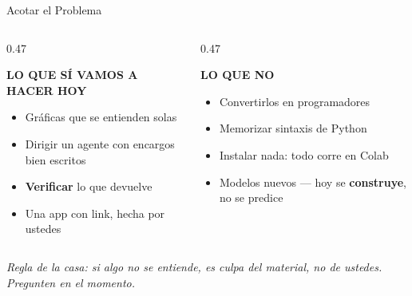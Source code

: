\documentclass[aspectratio=169, 11pt]{beamer}
\begin{document}
\begin{frame}[shrink=5]{Acotar el Problema}
  \vspace{2pt}
  \begin{columns}[T]
    \begin{column}{0.47\textwidth}
      \begin{tcolorbox}[colback=arcaGray, colframe=codeGreen, boxrule=0pt,
        leftrule=3pt, arc=3pt, left=8pt, right=8pt, top=5pt, bottom=5pt]
        {\scriptsize\color{codeGreen}\bfseries LO QUE SÍ VAMOS A HACER HOY}\\[4pt]
        {\footnotesize\color{textMuted}
        \begin{itemize}\setlength{\itemsep}{3pt}
          \item[{\color{codeGreen}\scriptsize\faCheck}]
            Gráficas que se entienden solas
          \item[{\color{codeGreen}\scriptsize\faCheck}]
            Dirigir un agente con encargos bien escritos
          \item[{\color{codeGreen}\scriptsize\faCheck}]
            \textbf{Verificar} lo que devuelve
          \item[{\color{codeGreen}\scriptsize\faCheck}]
            Una app con link, hecha por ustedes
        \end{itemize}}
      \end{tcolorbox}
    \end{column}
    \begin{column}{0.47\textwidth}
      \begin{tcolorbox}[colback=arcaGray, colframe=arcaRed, boxrule=0pt,
        leftrule=3pt, arc=3pt, left=8pt, right=8pt, top=5pt, bottom=5pt]
        {\scriptsize\color{arcaRed}\bfseries LO QUE NO}\\[4pt]
        {\footnotesize\color{textMuted}
        \begin{itemize}\setlength{\itemsep}{3pt}
          \item[{\color{arcaRed}\scriptsize\faTimes}]
            Convertirlos en programadores
          \item[{\color{arcaRed}\scriptsize\faTimes}]
            Memorizar sintaxis de Python
          \item[{\color{arcaRed}\scriptsize\faTimes}]
            Instalar nada: todo corre en Colab
          \item[{\color{arcaRed}\scriptsize\faTimes}]
            Modelos nuevos --- hoy se \textbf{construye}, no se predice
        \end{itemize}}
      \end{tcolorbox}
    \end{column}
  \end{columns}
  \vspace{7pt}
  {\footnotesize\color{arcaDark}\itshape
   Regla de la casa: si algo no se entiende, es culpa del material, no de
   ustedes. Pregunten en el momento.}
\end{frame}
\end{document}
